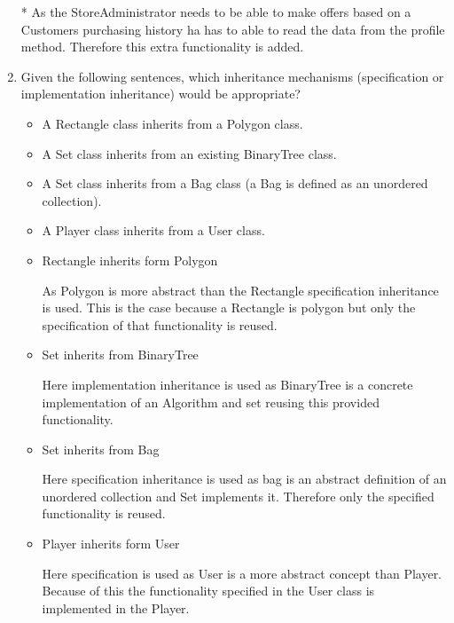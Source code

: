 \documentclass[a4paper, 10pt]{article}
\begin{document}
\begin{enumerate}
    * As the StoreAdministrator needs to be able to make offers based on a Customers purchasing history 
    ha has to able to read the data from the profile method. Therefore this extra functionality is added.
    \item
    Given the following sentences, which inheritance mechanisms (specification or implementation inheritance) would be appropriate?
    \begin{itemize}
        \item A Rectangle class inherits from a Polygon class.
        \item A Set class inherits from an existing BinaryTree class.
        \item A Set class inherits from a Bag class (a Bag is defined as an unordered collection).
        \item A Player class inherits from a User class.
    \end{itemize}
    \vspace{0.5cm}


    \begin{itemize}
        \item Rectangle inherits form Polygon

        As Polygon is more abstract than the Rectangle specification inheritance is used.
        This is the case because a Rectangle is polygon but only the specification of that functionality is reused.
        \item Set inherits from BinaryTree 

        Here implementation inheritance is used as BinaryTree is a concrete implementation of an Algorithm
        and set reusing this provided functionality.
        \item  Set inherits from Bag 

        Here specification inheritance is used as bag is an abstract definition of an unordered collection 
        and Set implements it. Therefore only the specified functionality is reused.
        \item Player inherits form User 

        Here specification is used as User is a more abstract concept than Player. Because of this the 
        functionality specified in the User class is implemented in the Player.
    \end{itemize}



\end{enumerate}
\end{document}
